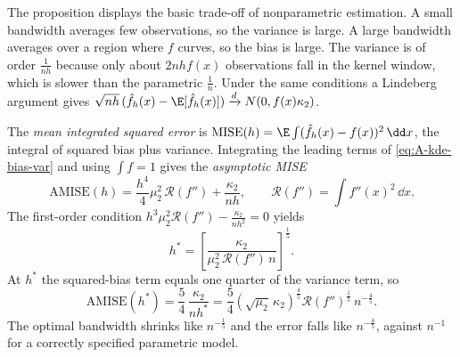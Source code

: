 The proposition displays the basic trade-off of nonparametric estimation. A small bandwidth averages
few observations, so the variance is large. A large bandwidth averages over a region where $f$ curves,
so the bias is large. The variance is of order $\frac{1}{nh}$ because only about $2nhf(x)$ observations
fall in the kernel window, which is slower than the parametric $\frac{1}{n}$. Under the same conditions
a Lindeberg argument gives
$\sqrt{nh}\,(\hat f_h(x)-\E[\hat f_h(x)])\xrightarrow{d}N(0,f(x)\kappa_2)$.

The \emph{mean integrated squared error} is
$\mathrm{MISE}(h)=\E\int(\hat f_h(x)-f(x))^2\,\dd x$, the integral of squared bias plus variance.
Integrating the leading terms of \eqref{eq:A-kde-bias-var} and using $\int f=1$ gives the
\emph{asymptotic MISE}
\begin{equation}\label{eq:A-amise}
\mathrm{AMISE}(h)=\frac{h^4}{4}\mu_2^2\,\mathcal{R}(f'')+\frac{\kappa_2}{nh},\qquad
\mathcal{R}(f'')=\int f''(x)^2\,\dd x .
\end{equation}
The first-order condition $h^3\mu_2^2\mathcal{R}(f'')-\frac{\kappa_2}{nh^2}=0$ yields
\begin{equation}\label{eq:A-hstar}
h^*=\left[\frac{\kappa_2}{\mu_2^2\,\mathcal{R}(f'')\,n}\right]^{\frac{1}{5}} .
\end{equation}
At $h^*$ the squared-bias term equals one quarter of the variance term, so
\begin{equation*}
\mathrm{AMISE}(h^*)=\frac{5}{4}\,\frac{\kappa_2}{nh^*}
=\frac{5}{4}\left(\sqrt{\mu_2}\,\kappa_2\right)^{\frac{4}{5}}\mathcal{R}(f'')^{\frac{1}{5}}\,n^{-\frac{4}{5}} .
\end{equation*}
The optimal bandwidth shrinks like $n^{-\frac{1}{5}}$ and the error falls like $n^{-\frac{4}{5}}$, against
$n^{-1}$ for a correctly specified parametric model.

